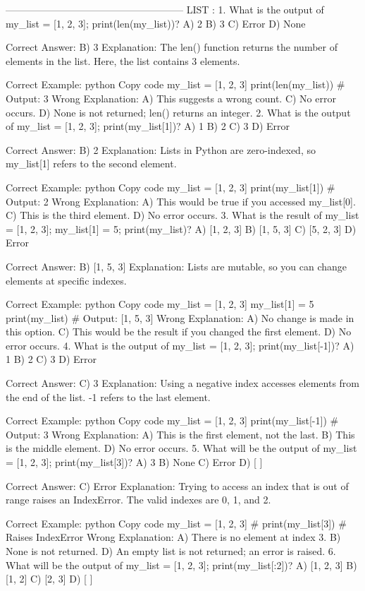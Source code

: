 ------------------------------------------------------
LIST :
1. What is the output of my_list = [1, 2, 3]; print(len(my_list))?
A) 2
B) 3
C) Error
D) None

Correct Answer: B) 3
Explanation: The len() function returns the number of elements in the list. Here, the list contains 3 elements.

Correct Example:
python
Copy code
my_list = [1, 2, 3]
print(len(my_list))  # Output: 3
Wrong Explanation:
A) This suggests a wrong count.
C) No error occurs.
D) None is not returned; len() returns an integer.
2. What is the output of my_list = [1, 2, 3]; print(my_list[1])?
A) 1
B) 2
C) 3
D) Error

Correct Answer: B) 2
Explanation: Lists in Python are zero-indexed, so my_list[1] refers to the second element.

Correct Example:
python
Copy code
my_list = [1, 2, 3]
print(my_list[1])  # Output: 2
Wrong Explanation:
A) This would be true if you accessed my_list[0].
C) This is the third element.
D) No error occurs.
3. What is the result of my_list = [1, 2, 3]; my_list[1] = 5; print(my_list)?
A) [1, 2, 3]
B) [1, 5, 3]
C) [5, 2, 3]
D) Error

Correct Answer: B) [1, 5, 3]
Explanation: Lists are mutable, so you can change elements at specific indexes.

Correct Example:
python
Copy code
my_list = [1, 2, 3]
my_list[1] = 5
print(my_list)  # Output: [1, 5, 3]
Wrong Explanation:
A) No change is made in this option.
C) This would be the result if you changed the first element.
D) No error occurs.
4. What is the output of my_list = [1, 2, 3]; print(my_list[-1])?
A) 1
B) 2
C) 3
D) Error

Correct Answer: C) 3
Explanation: Using a negative index accesses elements from the end of the list. -1 refers to the last element.

Correct Example:
python
Copy code
my_list = [1, 2, 3]
print(my_list[-1])  # Output: 3
Wrong Explanation:
A) This is the first element, not the last.
B) This is the middle element.
D) No error occurs.
5. What will be the output of my_list = [1, 2, 3]; print(my_list[3])?
A) 3
B) None
C) Error
D) [ ]

Correct Answer: C) Error
Explanation: Trying to access an index that is out of range raises an IndexError. The valid indexes are 0, 1, and 2.

Correct Example:
python
Copy code
my_list = [1, 2, 3]
# print(my_list[3])  # Raises IndexError
Wrong Explanation:
A) There is no element at index 3.
B) None is not returned.
D) An empty list is not returned; an error is raised.
6. What will be the output of my_list = [1, 2, 3]; print(my_list[:2])?
A) [1, 2, 3]
B) [1, 2]
C) [2, 3]
D) [ ]

